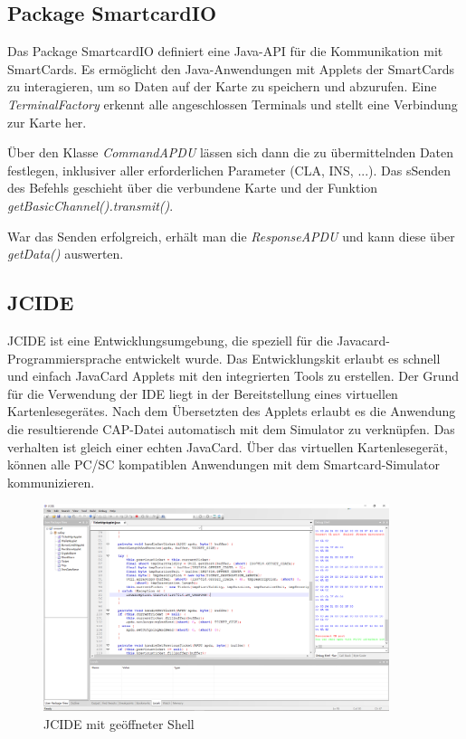 \documentclass[	a4paper,
			11pt,
			oneside,
			parskip]{scrartcl}
\begin{document}
\subsection{Package SmartcardIO}

Das Package SmartcardIO definiert eine Java-API für die Kommunikation mit SmartCards. Es ermöglicht den Java-Anwendungen mit Applets der SmartCards zu interagieren, um so Daten auf der Karte zu speichern und abzurufen. Eine \textit{TerminalFactory} erkennt alle angeschlossen Terminals und stellt eine Verbindung zur Karte her. \medskip

Über den Klasse \textit{CommandAPDU} lässen sich dann die zu übermittelnden Daten festlegen, inklusiver aller erforderlichen Parameter (CLA, INS, ...). Das sSenden des Befehls geschieht über die verbundene Karte und der Funktion \textit{getBasicChannel().transmit()}. \medskip

War das Senden erfolgreich, erhält man die \textit{ResponseAPDU} und kann diese über \textit{getData()} auswerten.

\subsection{JCIDE}

JCIDE ist eine Entwicklungsumgebung, die speziell für die Javacard-Programmiersprache entwickelt wurde. Das Entwicklungskit erlaubt es schnell und einfach JavaCard Applets mit den integrierten Tools zu erstellen. Der Grund für die Verwendung der IDE liegt in der Bereitstellung eines virtuellen Kartenlesegerätes. Nach dem Übersetzten des Applets erlaubt es die Anwendung die resultierende CAP-Datei automatisch mit dem Simulator zu verknüpfen. Das verhalten ist gleich einer echten JavaCard. Über das virtuellen Kartenlesegerät, können alle PC/SC kompatiblen Anwendungen mit dem Smartcard-Simulator kommunizieren. \medskip

\begin{figure}[H]
	\centering
  	\includegraphics[width=0.9\textwidth]{img/jcide}
	\caption{JCIDE mit geöffneter Shell}
	\label{jcide}
\end{figure}
\end{document}
